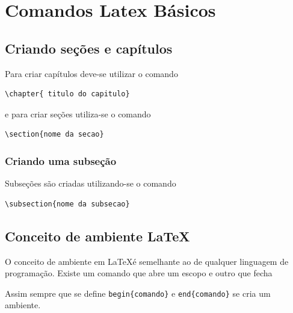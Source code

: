 

\chapter{Comandos Latex Básicos }
\thispagestyle{empty}
\section{Criando seções e capítulos}

Para criar capítulos deve-se utilizar o comando 
\begin{verbatim}
\chapter{ titulo do capitulo}                                               
\end{verbatim} 
e  para criar seções utiliza-se o comando 
\begin{verbatim}
\section{nome da secao} 
\end{verbatim}
 
\subsection{Criando uma subseção}

Subseções são criadas utilizando-se o comando
\begin{verbatim}
\subsection{nome da subsecao} 
\end{verbatim}

\section{Conceito de ambiente \LaTeX }

O conceito de ambiente em \LaTeX é semelhante ao de qualquer linguagem de
programação. Existe um comando que abre um escopo e outro que fecha

Assim sempre que se define \verb|begin{comando}| e \verb|end{comando}| se cria
um ambiente.

